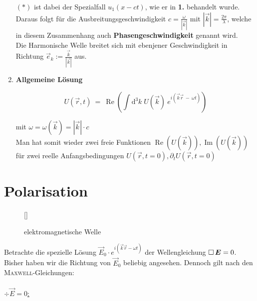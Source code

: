 \begin{enumerate}[label=\textbf{\arabic* .}]
$(*)$ ist dabei der Spezialfall $u_1(x-ct)$, wie er in \textbf{1.} behandelt wurde.\\
Daraus folgt für die Ausbreitungsgeschwindigkeit $c =\frac{\omega}{|\vec{k}|}$ mit $|\vec{k}|=\frac{2\pi}{\lambda}$, welche in diesem Zusammenhang auch \textbf{Phasengeschwindigkeit} genannt wird.\\
Die Harmonische Welle breitet sich mit ebenjener Geschwindigkeit in Richtung $\vec{e}_k := \frac{\vec{k}}{|\vec{k}|}$ aus.

\item \textbf{Allgemeine Lösung}

\begin{equation*}
U(\vec{r},t) \ = \ \operatorname{Re} \left(\int\mathrm{d}^3 k \; U(\vec{k}) \ e^{i(\vec{k}\vec{r} \ - \ \omega t)}\right)
\end{equation*}

mit $\omega = \omega(\vec{k}) = |\vec{k}| \cdot c$\\
Man hat somit wieder zwei freie Funktionen $\operatorname{Re}(U(\vec{k})), \operatorname{Im}(U(\vec{k}))$ für zwei reelle Anfangsbedingungen $U(\vec{r},t=0), \partial_t U(\vec{r},t=0)$

\end{enumerate}


\section{Polarisation}
\begin{wrapfigure}[]{r}[0cm]{0cm}
	\raisebox{0pt}[\dimexpr{}\baselineskip\relax]{
		\colorbox{hgrey}{
		}
	}
	\caption{elektromagnetische Welle}
\end{wrapfigure}
Betrachte die spezielle Lösung $\vec{E}_0 \cdot e^{i(\vec{k}\vec{r} - \omega t)}$ der Wellengleichung $\mathop{{}\Box}\nolimits \bm{E} = 0$. Bisher haben wir die Richtung von $\vec{E}_0$ beliebig angesehen. Dennoch gilt nach den \textsc{Maxwell}-Gleichungen:\
\\
\ \\ \linebreak\linebreak\linebreak\linebreak
\underline{$\div\vec{E} = 0$:}

